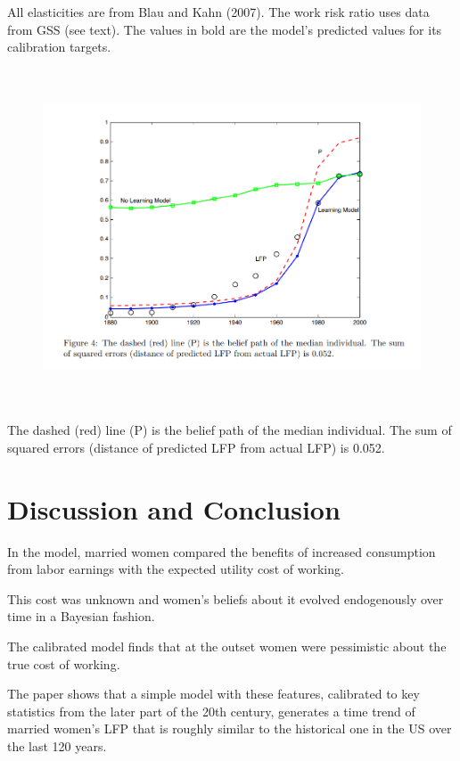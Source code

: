 \documentclass[titlepage]{\econtex}
\begin{document}
 All elasticities are from Blau and  Kahn (2007). The work risk ratio uses data from GSS (see text). The values in bold are the model's predicted values for its calibration
targets. 
  
\begin{figure}[H]
  \centering
  \includegraphics[width=1\textwidth, height=10cm]{Figure4.png}
  \caption{}
    \label{fig:Figure 4}
  \end{figure}

The dashed (red) line (P) is the belief path of the median individual. The sum of squared errors (distance of predicted LFP from actual LFP) is 0.052. 

\hypertarget{Simulation Results}{}
\section{Discussion and Conclusion}

 In the model, married women compared the benefits of increased consumption from labor earnings with the expected utility cost of working.

This cost was unknown and women's beliefs about it evolved endogenously over time in a Bayesian fashion.

The calibrated model finds that at the outset women were pessimistic about the true cost of working.

The paper shows that a simple model with these features, calibrated to key statistics from the later part of the 20th century, generates a time trend of married women's LFP that is roughly similar to the historical one in the US over the last 120 years.


\clearpage\vfill\eject

\onlyinsubfile{}
\end{document}
